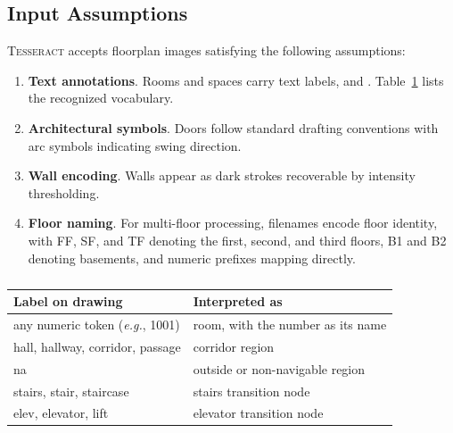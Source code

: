 \documentclass[manuscript,screen,review]{acmart}
\newcommand{\tesseract}{\textsc{Tesseract}}
\newcommand{\eg}{\textit{e.g.}}
\begin{document}
\subsection{Input Assumptions}
\label{subsec:input}

 \tesseract{} accepts floorplan images satisfying the following assumptions:

\begin{enumerate}
    \item \textbf{Text annotations}. Rooms and spaces carry text labels, and . Table~\ref{tab:vocabulary} lists the recognized vocabulary.
    \item \textbf{Architectural symbols}. Doors follow standard drafting conventions with arc symbols indicating swing direction.
    \item \textbf{Wall encoding}. Walls appear as dark strokes recoverable by intensity thresholding.
    \item \textbf{Floor naming}. For multi-floor processing, filenames encode floor identity, with FF, SF, and TF denoting the first, second, and third floors, B1 and B2 denoting basements, and numeric prefixes mapping directly.
\end{enumerate}

\begin{table}[!htbp]
\centering
\caption{}
\label{tab:vocabulary}
\begin{tabular}{ll}
\toprule
Label on drawing & Interpreted as \\
\midrule
any numeric token (\eg, 1001) & room, with the number as its name \\
hall, hallway, corridor, passage & corridor region \\
na & outside or non-navigable region \\
stairs, stair, staircase & stairs transition node \\
elev, elevator, lift & elevator transition node \\
\bottomrule
\end{tabular}
\end{table}

\end{document}
